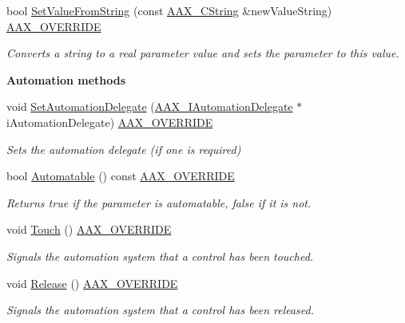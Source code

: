 \begin{Indent}
\begin{DoxyCompactItemize}
bool \mbox{\hyperlink{a01537_aa9194daefda8f6491849819fb25a73d2}{Set\+Value\+From\+String}} (const \mbox{\hyperlink{a01573}{A\+A\+X\+\_\+\+C\+String}} \&new\+Value\+String) \mbox{\hyperlink{a00392_ac2f24a5172689ae684344abdcce55463}{A\+A\+X\+\_\+\+O\+V\+E\+R\+R\+I\+DE}}
\begin{DoxyCompactList}\small\item\em Converts a string to a real parameter value and sets the parameter to this value. \end{DoxyCompactList}\end{DoxyCompactItemize}
\end{Indent}
\begin{Indent}\textbf{ Automation methods}\par
\begin{DoxyCompactItemize}
\item 
void \mbox{\hyperlink{a01537_aceb34aeadaca054f318004d49a0bd5b7}{Set\+Automation\+Delegate}} (\mbox{\hyperlink{a01773}{A\+A\+X\+\_\+\+I\+Automation\+Delegate}} $\ast$i\+Automation\+Delegate) \mbox{\hyperlink{a00392_ac2f24a5172689ae684344abdcce55463}{A\+A\+X\+\_\+\+O\+V\+E\+R\+R\+I\+DE}}
\begin{DoxyCompactList}\small\item\em Sets the automation delegate (if one is required) \end{DoxyCompactList}\item 
bool \mbox{\hyperlink{a01537_aebb304bbabf739d5019bd6372e8928d7}{Automatable}} () const \mbox{\hyperlink{a00392_ac2f24a5172689ae684344abdcce55463}{A\+A\+X\+\_\+\+O\+V\+E\+R\+R\+I\+DE}}
\begin{DoxyCompactList}\small\item\em Returns true if the parameter is automatable, false if it is not. \end{DoxyCompactList}\item 
void \mbox{\hyperlink{a01537_afb023dec89c366c2f5667c2a225b1df9}{Touch}} () \mbox{\hyperlink{a00392_ac2f24a5172689ae684344abdcce55463}{A\+A\+X\+\_\+\+O\+V\+E\+R\+R\+I\+DE}}
\begin{DoxyCompactList}\small\item\em Signals the automation system that a control has been touched. \end{DoxyCompactList}\item 
void \mbox{\hyperlink{a01537_a52d73a61f7b7cdc7125e76617883f3fd}{Release}} () \mbox{\hyperlink{a00392_ac2f24a5172689ae684344abdcce55463}{A\+A\+X\+\_\+\+O\+V\+E\+R\+R\+I\+DE}}
\begin{DoxyCompactList}\small\item\em Signals the automation system that a control has been released. \end{DoxyCompactList}\end{DoxyCompactItemize}
\end{Indent}
